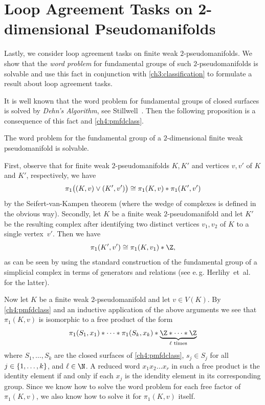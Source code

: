 \section{Loop Agreement Tasks on 2-dimensional Pseudomanifolds}
\label{ch4:sec:latonpmfd}
Lastly, we consider loop agreement tasks on finite weak $2$-pseudomanifolds.
We show that the \emph{word problem} for fundamental groups of such $2$-pseudomanifolds
is solvable and use this fact in conjunction with \cref{ch3:classification}
to formulate a result about loop agreement tasks.

It is well known that the word problem for fundamental groups of closed surfaces
is solved by \emph{Dehn's Algorithm}, see
Stillwell~\cite[Sec.~6.1]{bookc:stillwell93}.
Then the following proposition is a consequence of this fact and
\cref{ch4:pmfdclass}.

\begin{thProposition}
    \label{ch4:wordproblem}
    The word problem for the fundamental group of a $2$-dimensional finite weak
    pseudomanifold is solvable.
\end{thProposition}

\begin{proofsketch}
    First, observe that for finite weak $2$-pseudomanifolds $K,K'$ and vertices
    $v,v'$ of $K$ and $K'$, respectively, we have 
    \[  \pi_1\bigl( (K,v) \vee (K',v') \bigr)
            \cong \pi_1(K,v) \ast \pi_1(K',v')
    \]
    by the Seifert-van-Kampen theorem (where the wedge of complexes is defined
    in the obvious way). Secondly, let $K$ be a finite weak $2$-pseudomanifold
    and let $K'$ be the resulting complex after identifying two distinct vertices
    $v_1,v_2$ of $K$ to a single vertex~$v'$. Then we have
    \[ \pi_1(K',v') \cong \pi_1(K,v_1) \ast \Z , \]
    as can be seen by using the standard construction of the fundamental group
    of a simplicial complex in terms of generators and relations (see e.\,g.
    Herlihy~et~al.~\cite[Subsec.~15.1.2]{bookc:herlihyetal13}
    for the latter).

    Now let $K$ be a finite weak $2$-pseudomanifold and let $v\in V(K)$.
    By \cref{ch4:pmfdclass} and an inductive application of the above arguments
    we see that $\pi_1(K,v)$ is isomorphic to a free product of the form
    \[ \pi_1(S_1,x_1) \ast \cdots \ast \pi_1(S_k,x_k)
        \ast \underbrace{\Z \ast \cdots \ast \Z}_{\ell\text{ times}}
    \]
    where $S_1,\dots,S_k$ are the closed surfaces of \cref{ch4:pmfdclass},
    $s_j\in S_j$ for all $j\in\{1,\ldots,k\}$, and $\ell\in\N$.
    A reduced word $x_1x_2\dots x_r$ in such a free product is the identity
    element if and only if each $x_j$ is the idendity element in its corresponding group.
    Since we know how to solve the word problem for each free factor
    of~$\pi_1(K,v)$, we also know how to solve it for $\pi_1(K,v)$ itself.
    \\
\end{proofsketch}

